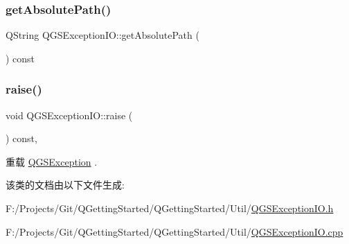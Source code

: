 \subsubsection{\texorpdfstring{get\+Absolute\+Path()}{getAbsolutePath()}}
{\footnotesize\ttfamily Q\+String Q\+G\+S\+Exception\+I\+O\+::get\+Absolute\+Path (\begin{DoxyParamCaption}{ }\end{DoxyParamCaption}) const}

\mbox{\label{class_q_g_s_exception_i_o_a8b20d2161d01b33d97c2713c34a3cf4d}} 
\subsubsection{\texorpdfstring{raise()}{raise()}}
{\footnotesize\ttfamily void Q\+G\+S\+Exception\+I\+O\+::raise (\begin{DoxyParamCaption}{ }\end{DoxyParamCaption}) const\hspace{0.3cm}{\ttfamily [override]}, {\ttfamily [virtual]}}



重载 \mbox{\hyperlink{class_q_g_s_exception_a78e6d3c9f92bbc94440d4c2e946beed2}{Q\+G\+S\+Exception}} .



该类的文档由以下文件生成\+:\begin{DoxyCompactItemize}
\item 
F\+:/\+Projects/\+Git/\+Q\+Getting\+Started/\+Q\+Getting\+Started/\+Util/\mbox{\hyperlink{_q_g_s_exception_i_o_8h}{Q\+G\+S\+Exception\+I\+O.\+h}}\item 
F\+:/\+Projects/\+Git/\+Q\+Getting\+Started/\+Q\+Getting\+Started/\+Util/\mbox{\hyperlink{_q_g_s_exception_i_o_8cpp}{Q\+G\+S\+Exception\+I\+O.\+cpp}}\end{DoxyCompactItemize}
